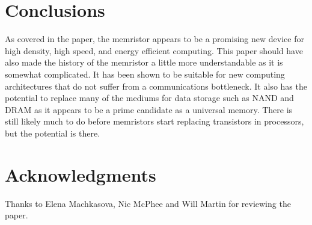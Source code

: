 \documentclass{sig-alternate}
\begin{document}
\section{Conclusions}
\label{sec:conclusions}

As covered in the paper, the memristor appears to be a promising new device for high density, high speed, and energy efficient computing.  This paper should have also made the history of the memristor a little more understandable as it is somewhat complicated.  It has been shown to be suitable for new computing architectures that do not suffer from a communications bottleneck.  It also has the potential to replace many of the mediums for data storage such as NAND and DRAM as it appears to be a prime candidate as a universal memory.  There is still likely much to do before memristors start replacing transistors in processors, but the potential is there.

\section*{Acknowledgments}
\label{sec:acknowledgments}
Thanks to Elena Machkasova, Nic McPhee and Will Martin for reviewing the paper.



  
\end{document}
